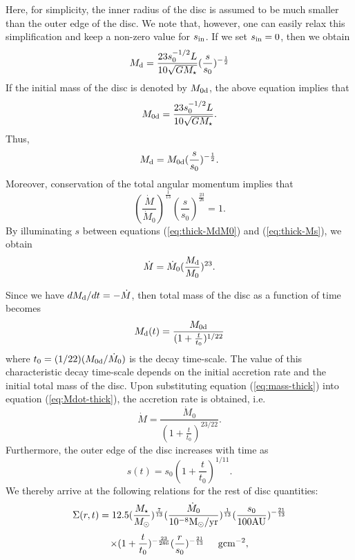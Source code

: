 \documentclass[apj]{emulateapj}
\begin{document}
Here, for simplicity, the inner radius of the disc is assumed to be much smaller than the outer edge of the disc. We note that, however, one can easily relax this simplification and keep a non-zero value for $s_{\rm in}$. If we set $s_{\rm in} =0$, then we obtain
%
\begin{equation}
M_{\rm d} =  \frac{23 s_{0}^{-1/2} L}{10\sqrt{GM_{\star}}} (\frac{s}{s_0})^{-\frac{1}{2}}
\end{equation}
%
If the initial mass of the disc is denoted by $M_{\rm 0d}$, the above equation implies that
%
\begin{equation}
M_{\rm 0d} =  \frac{23 s_{0}^{-1/2} L}{10\sqrt{GM_{\star}}}.
\end{equation}
%
Thus,
%
\begin{equation}\label{eq:thick-MdM0}
M_{\rm d} = M_{\rm 0d} (\frac{s}{s_0})^{-\frac{1}{2}}.
\end{equation}
%
Moreover, conservation of the total angular momentum implies that
%
%
\begin{equation}\label{eq:thick-Ms}
(\frac{\dot{M}}{\dot{M}_0 })^{\frac{1}{13}} (\frac{s}{s_0})^{\frac{23}{26}}=1.
\end{equation}
%
By illuminating $s$ between equations (\ref{eq:thick-MdM0}) and (\ref{eq:thick-Ms}), we obtain
%
\begin{equation}\label{eq:Mdot-thick}
\dot{M} = \dot{M}_0 (\frac{M_{\rm d}}{M_0})^{23}.
\end{equation}
%

Since we have $dM_{\rm d}/dt = -\dot{M}$, then total mass of the disc as a function of time becomes
%
%
\begin{equation}\label{eq:mass-thick}
M_{\rm d}(t) =\frac{M_{\rm 0d}}{(1+\frac{t}{t_0})^{1/22}}
\end{equation}
%
where $t_0 = (1/22)(M_{\rm 0d}/\dot{M}_0 )$ is the decay time-scale. The value of this characteristic decay time-scale depends on the initial accretion rate and the initial total mass of the disc. Upon substituting equation (\ref{eq:mass-thick}) into equation (\ref{eq:Mdot-thick}), the accretion rate is obtained, i.e.
%
%
\begin{equation}
\dot{M} = \frac{\dot{M}_0 }{(1+\frac{t}{t_0})^{23/22}}.
\end{equation}
%
Furthermore, the outer edge of the disc increases with time as
%
\begin{equation}
s(t) = s_0 (1+\frac{t}{t_0})^{1/11}.
\end{equation}
%
We thereby arrive at the following relations for  the rest of disc quantities:
%
\begin{displaymath}
\Sigma (r,t) = 12.5 (\frac{M_{\star}}{M_{\odot}})^{\frac{7}{13}} (\frac{\dot{M}_0}{10^{-8} {\rm M}_{\odot}/{\rm yr}})^{\frac{1}{13}} (\frac{s_0}{100 {\rm AU}})^{-\frac{21}{13}}
\end{displaymath}
%
\begin{equation}
\times (1+\frac{t}{t_0})^{-\frac{23}{286}} (\frac{r}{s_0})^{-\frac{21}{13}} \hspace{0.5cm} {\rm g} {\rm cm}^{-2},
\end{equation}
\end{document}
